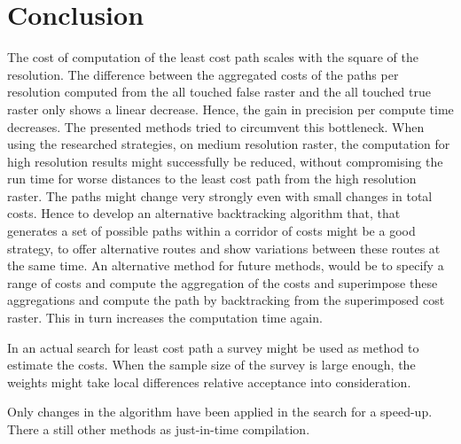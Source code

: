 \documentclass[acmtog]{acmart}
\begin{document}
	\section{Conclusion}\label{sec:conclusion}
	The cost of computation of the least cost path scales with the square of the resolution.
	The difference between the aggregated costs of the paths per resolution computed from the all touched false raster and the all touched true raster only shows a linear decrease.
	Hence, the gain in precision per compute time decreases.
	The presented methods tried to circumvent this bottleneck.
	When using the researched strategies, on medium resolution raster, the computation for high resolution results might successfully be reduced, without compromising the run time for worse distances to the least cost path from the high resolution raster.
	The paths might change very strongly even with small changes in total costs.
	Hence to develop an alternative backtracking algorithm that, that generates a set of possible paths within a corridor of costs might be a good strategy, to offer alternative routes and show variations between these routes at the same time.
	An alternative method for future methods, would be to specify a range of costs and compute the aggregation of the costs and superimpose these aggregations and compute the path by backtracking from the superimposed cost raster. 
	This in turn increases the computation time again.
	
	In an actual search for least cost path a survey might be used as method to estimate the costs.
	When the sample size of the survey is large enough, the
	weights might take local differences relative acceptance into consideration.
	
	Only changes in the algorithm have been applied in the search for a speed-up.
	There a still other methods as just-in-time compilation.












\end{document}
